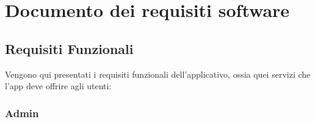\section{Documento dei requisiti software}
    \subsection{Requisiti Funzionali}
        \begin{flushleft}  
            {\large
                Vengono qui presentati i requisiti funzionali dell'applicativo, ossia quei servizi che l'app  deve offrire agli utenti:
            } 
        \end{flushleft}
        
        \subsubsection{Admin}
        

